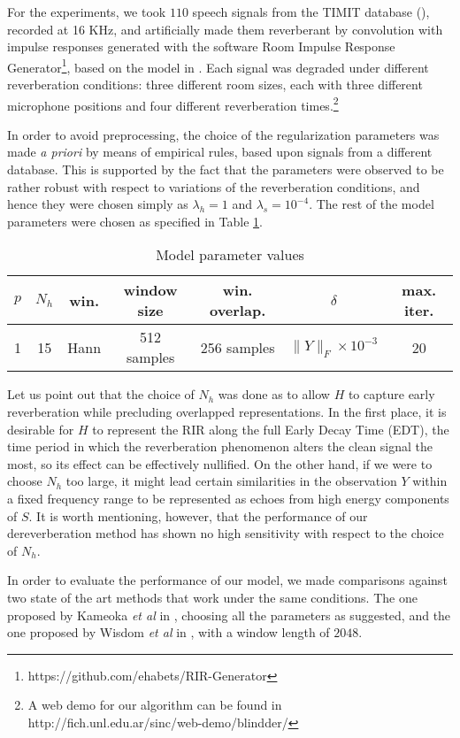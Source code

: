\documentclass[12pt]{article}
\begin{document}
For the experiments, we took $110$ speech signals from the TIMIT database (\cite{zue1990timit}), recorded at 16 KHz,  and artificially made them reverberant by convolution with impulse responses generated with the software Room Impulse Response Generator\footnote{https://github.com/ehabets/RIR-Generator}, based on the model in \cite{allen1979}. Each signal was degraded under different reverberation conditions: three different room sizes, each with three different microphone positions and four different reverberation times.\footnote{A web demo for our algorithm can be found in http://fich.unl.edu.ar/sinc/web-demo/blindder/}

In order to avoid preprocessing, the choice of the regularization parameters was made \emph{a priori} by means of empirical rules, based upon signals from a different database. This is supported by the fact that the parameters were observed to be rather robust with respect to variations of the reverberation conditions, and hence they were chosen simply as $\lambda_h = 1$ and $\lambda_s = 10^{-4}$. The rest of the model parameters were chosen as specified in Table \ref{tab:params}.

\begin{table}[h]
\centering
\begin{tabular}{|ccccccc|}
\hline
 $p$ & $N_h$ & win. & window size & win. overlap. & $\delta$ &max. iter. \\
\hline
\hline
1 & 15 & Hann & 512 samples& 256 samples & \small{$\|Y\|_F\times 10^{-3}$} &20 \\
\hline
\end{tabular}
\caption{Model parameter values}
\label{tab:params}
\end{table}

Let us point out that the choice of $N_h$ was done as to allow $H$ to capture early reverberation while precluding overlapped representations. In the first place, it is desirable for $H$ to represent the RIR along the full Early Decay Time (EDT), the time period in which the reverberation phenomenon alters the clean signal the most, so its effect can be effectively nullified. On the other hand, if we were to choose $N_h$ too large, it might lead certain similarities in the observation $Y$ within a fixed frequency range to be represented as echoes from high energy components of $S$. It is worth mentioning, however, that the performance of our dereverberation method has shown no high sensitivity with respect to the choice of $N_h$.

In order to evaluate the performance of our model, we made comparisons against two state of the art methods that work under the same conditions. The one proposed by Kameoka \emph{et al} in \cite{kameoka2009}, choosing all the parameters as suggested, and the one proposed by Wisdom \emph{et al} in \cite{wisdom2014}, with a window length of $2048$.
\end{document}
